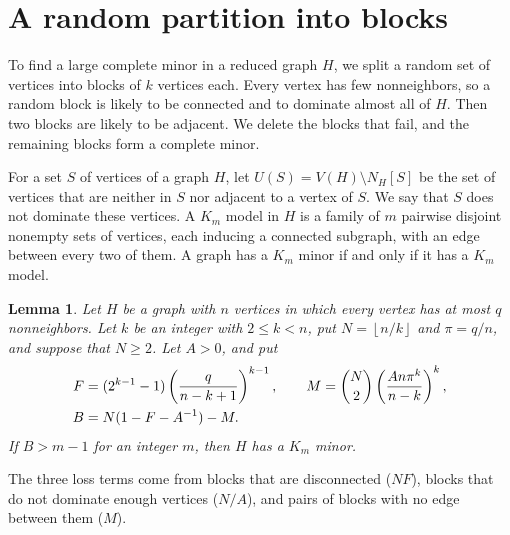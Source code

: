 \documentclass[11pt]{article}
\newtheorem{lemma}{Lemma}
\newcommand{\floor}[1]{\left\lfloor#1\right\rfloor}
\begin{document}
\section{A random partition into blocks}\label{sec:partition}

To find a large complete minor in a reduced graph $H$, we split a random set
of vertices into blocks of $k$ vertices each. Every vertex has few
nonneighbors, so a random block is likely to be connected and to dominate
almost all of $H$. Then two blocks are likely to be adjacent. We delete the
blocks that fail, and the remaining blocks form a complete minor.

For a set $S$ of vertices of a graph $H$, let $U(S)=V(H)\setminus N_H[S]$ be
the set of vertices that are neither in $S$ nor adjacent to a vertex of $S$.
We say that $S$ does not dominate these vertices. A $K_m$ model in $H$ is a
family of $m$ pairwise disjoint nonempty sets of vertices, each inducing a
connected subgraph, with an edge between every two of them. A graph has a
$K_m$ minor if and only if it has a $K_m$ model.

\begin{lemma}\label{lem:partition}
Let $H$ be a graph with $n$ vertices in which every vertex has at most $q$
nonneighbors. Let $k$ be an integer with $2\le k<n$, put $N=\floor{n/k}$ and
$\pi=q/n$, and suppose that $N\ge2$. Let $A>0$, and put
\begin{align}
 F&=(2^{k-1}-1)\left(\frac{q}{n-k+1}\right)^{k-1},\qquad
 M=\binom N2\left(\frac{An\pi^k}{n-k}\right)^k,\notag\\
 B&=N(1-F-A^{-1})-M.\label{eq:B}
\end{align}
If $B>m-1$ for an integer $m$, then $H$ has a $K_m$ minor.
\end{lemma}

The three loss terms come from blocks that are disconnected ($NF$), blocks
that do not dominate enough vertices ($N/A$), and pairs of blocks with no
edge between them ($M$).
\end{document}
